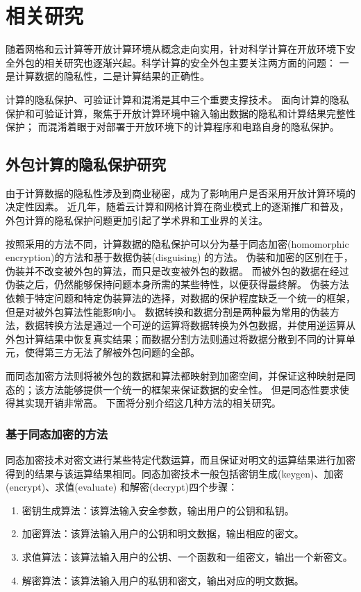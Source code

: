 \chapter{相关研究}
随着网格和云计算等开放计算环境从概念走向实用，针对科学计算在开放环境下安全外包的相关研究也逐渐兴起。科学计算的安全外包主要关注两方面的问题：
一是计算数据的隐私性，二是计算结果的正确性。

计算的隐私保护、可验证计算和混淆是其中三个重要支撑技术。
面向计算的隐私保护和可验证计算，聚焦于开放计算环境中输入输出数据的隐私和计算结果完整性保护；
而混淆着眼于对部署于开放环境下的计算程序和电路自身的隐私保护。

\label{chap:2}
\section{外包计算的隐私保护研究}
由于计算数据的隐私性涉及到商业秘密，成为了影响用户是否采用开放计算环境的决定性因素。
近几年，随着云计算和网格计算在商业模式上的逐渐推广和普及，
外包计算的隐私保护问题更加引起了学术界和工业界的关注。

按照采用的方法不同，计算数据的隐私保护可以分为基于同态加密(homomorphic encryption)的方法和基于数据伪装(disguising) 的方法。
伪装和加密的区别在于，伪装并不改变被外包的算法，而只是改变被外包的数据。
而被外包的数据在经过伪装之后，仍然能够保持问题本身所需的某些特性，以便获得最终解。
伪装方法依赖于特定问题和特定伪装算法的选择，对数据的保护程度缺乏一个统一的框架，但是对被外包算法性能影响小。
数据转换和数据分割是两种最为常用的伪装方法，数据转换方法是通过一个可逆的运算将数据转换为外包数据，并使用逆运算从外包计算结果中恢复真实结果；而数据分割方法则通过将数据分散到不同的计算单元，使得第三方无法了解被外包问题的全部。

而同态加密方法则将被外包的数据和算法都映射到加密空间，并保证这种映射是同态的；该方法能够提供一个统一的框架来保证数据的安全性。
但是同态性要求使得其实现开销非常高。
下面将分别介绍这几种方法的相关研究。

\subsection{基于同态加密的方法}
同态加密技术对密文进行某些特定代数运算，而且保证对明文的运算结果进行加密得到的结果与该运算结果相同。同态加密技术一般包括密钥生成(keygen)、加密(encrypt)、求值(evaluate) 和解密(decrypt)四个步骤：

\begin{enumerate}
\item 密钥生成算法：该算法输入安全参数，输出用户的公钥和私钥。
\item 加密算法：该算法输入用户的公钥和明文数据，输出相应的密文。
\item 求值算法：该算法输入用户的公钥、一个函数和一组密文，输出一个新密文。
\item 解密算法：该算法输入用户的私钥和密文，输出对应的明文数据。
\end{enumerate}

